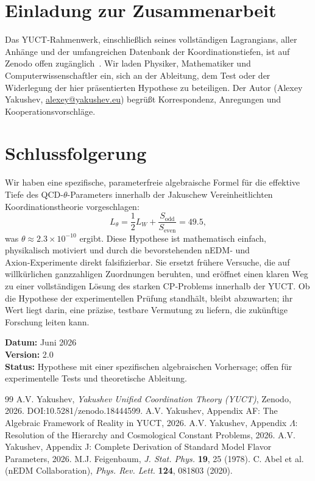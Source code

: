\documentclass[12pt,a4paper]{article}
\begin{document}
	\section{Einladung zur Zusammenarbeit}
	\label{sec:invite}
	
	Das YUCT‑Rahmenwerk, einschließlich seines vollständigen Lagrangians, aller Anhänge und der umfangreichen Datenbank der Koordinationstiefen, ist auf Zenodo offen zugänglich~\cite{Y1,Y2}. Wir laden Physiker, Mathematiker und Computerwissenschaftler ein, sich an der Ableitung, dem Test oder der Widerlegung der hier präsentierten Hypothese zu beteiligen. Der Autor (Alexey Yakushev, \href{mailto:alexey@yakushev.eu}{alexey@yakushev.eu}) begrüßt Korrespondenz, Anregungen und Kooperationsvorschläge.
	
	\section{Schlussfolgerung}
	\label{sec:conclusion}
	
	Wir haben eine spezifische, parameterfreie algebraische Formel für die effektive Tiefe des QCD-\(\theta\)-Parameters innerhalb der Jakuschew Vereinheitlichten Koordinationstheorie vorgeschlagen:
	\[
	L_\theta = \frac{1}{2}L_W + \frac{S_{\mathrm{odd}}}{S_{\mathrm{even}}} = 49.5,
	\]
	was \(\theta \approx 2.3 \times 10^{-10}\) ergibt. Diese Hypothese ist mathematisch einfach, physikalisch motiviert und durch die bevorstehenden nEDM‑ und Axion‑Experimente direkt falsifizierbar. Sie ersetzt frühere Versuche, die auf willkürlichen ganzzahligen Zuordnungen beruhten, und eröffnet einen klaren Weg zu einer vollständigen Lösung des starken CP‑Problems innerhalb der YUCT. Ob die Hypothese der experimentellen Prüfung standhält, bleibt abzuwarten; ihr Wert liegt darin, eine präzise, testbare Vermutung zu liefern, die zukünftige Forschung leiten kann.
	
	\vspace{1cm}
	\noindent\textbf{Datum:} Juni 2026\\
	\textbf{Version:} 2.0\\
	\textbf{Status:} Hypothese mit einer spezifischen algebraischen Vorhersage; offen für experimentelle Tests und theoretische Ableitung.
	
	\newpage
	\begin{thebibliography}{99}
		 A.V. Yakushev, \textit{Yakushev Unified Coordination Theory (YUCT)}, Zenodo, 2026. DOI:10.5281/zenodo.18444599.
		 A.V. Yakushev, Appendix AF: The Algebraic Framework of Reality in YUCT, 2026.
		 A.V. Yakushev, Appendix \(\Lambda\): Resolution of the Hierarchy and Cosmological Constant Problems, 2026.
		 A.V. Yakushev, Appendix J: Complete Derivation of Standard Model Flavor Parameters, 2026.
		 M.J. Feigenbaum, \textit{J. Stat. Phys.} \textbf{19}, 25 (1978).
		 C. Abel et al. (nEDM Collaboration), \textit{Phys. Rev. Lett.} \textbf{124}, 081803 (2020).
	\end{thebibliography}
	
\end{document}
